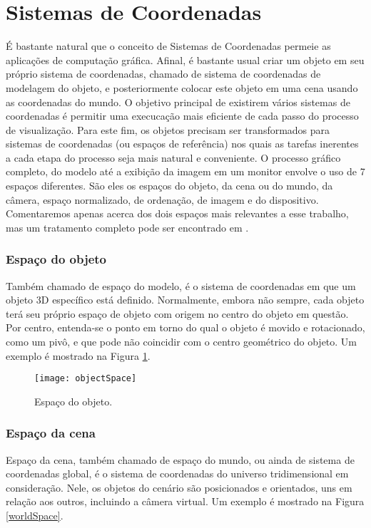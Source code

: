 \section{Sistemas de Coordenadas}

É bastante natural que o conceito de Sistemas de Coordenadas permeie as aplicações de computação gráfica. Afinal, é bastante usual criar um objeto em seu próprio sistema de coordenadas, chamado de sistema de coordenadas de modelagem do objeto, e posteriormente colocar este objeto em uma cena usando as coordenadas do mundo. O objetivo principal de existirem vários sistemas de coordenadas é permitir uma execucação mais eficiente de cada passo do processo de visualização. Para este fim, os objetos precisam ser transformados para sistemas de coordenadas (ou espaços de referência) nos quais as tarefas inerentes a cada etapa do processo seja mais natural e conveniente. O processo gráfico completo, do modelo até a exibição da imagem em um monitor envolve o uso de 7 espaços diferentes. São eles os espaços do objeto, da cena ou do mundo, da câmera, espaço normalizado, de ordenação, de imagem e do dispositivo. Comentaremos apenas acerca dos dois espaços mais relevantes a esse trabalho, mas um tratamento completo pode ser encontrado em \cite{ANGEL}.

\subsubsection{Espaço do objeto}
Também chamado de espaço do modelo, é o sistema de coordenadas em que um objeto 3D específico está definido. Normalmente, embora não sempre, cada objeto terá seu próprio espaço de objeto com origem no centro do objeto em questão. Por centro, entenda-se o ponto em torno do qual o objeto é movido e rotacionado, como um pivô, e que pode não coincidir com o centro geométrico do objeto. Um exemplo é mostrado na Figura \ref{objectSpace}.

\begin{figure}[!htb]
\center
\texttt{[image: objectSpace]}
\caption{Espaço do objeto.}
\label{objectSpace}
\end{figure}

\subsubsection{Espaço da cena}
Espaço da cena, também chamado de espaço do mundo, ou ainda de sistema de coordenadas global, é o sistema de coordenadas do universo tridimensional em consideração. Nele, os objetos do cenário são posicionados e orientados, uns em relação aos outros, incluindo a câmera virtual. Um exemplo é mostrado na Figura \ref{worldSpace}.


